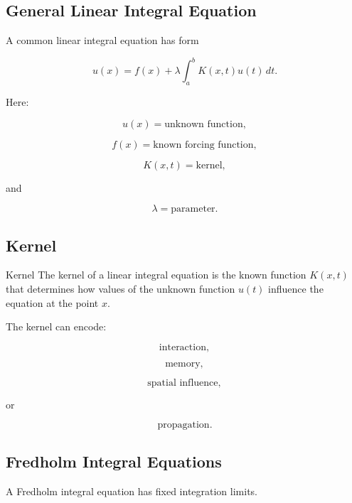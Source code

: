\subsection{General Linear Integral Equation}
\label{subsec:general-linear-integral-equation}

A common linear integral equation has form

\[
\boxed{
u(x)
=
f(x)
+
\lambda
\int_a^b
K(x,t)u(t)\,dt.
}
\]

Here:

\[
u(x)
=
\text{unknown function},
\]

\[
f(x)
=
\text{known forcing function},
\]

\[
K(x,t)
=
\text{kernel},
\]

and

\[
\lambda
=
\text{parameter}.
\]

\subsection{Kernel}
\label{subsec:integral-equation-kernel}

\begin{definitionbox}{Kernel}
The kernel of a linear integral equation is the known function \(K(x,t)\)
that determines how values of the unknown function \(u(t)\) influence
the equation at the point \(x\).
\end{definitionbox}

The kernel can encode:

\[
\boxed{
\text{interaction},
}
\]

\[
\boxed{
\text{memory},
}
\]

\[
\boxed{
\text{spatial influence},
}
\]

or

\[
\boxed{
\text{propagation}.
}
\]

\subsection{Fredholm Integral Equations}
\label{subsec:fredholm-integral-equations}

A Fredholm integral equation has fixed integration limits.

